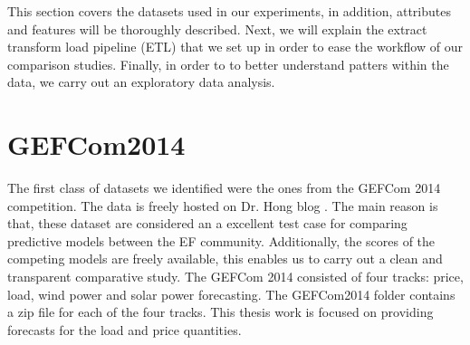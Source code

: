 






This section covers the datasets used in our experiments, in addition, attributes and features will be thoroughly described.
Next, we will explain the extract transform load pipeline (ETL) that we set up in order to ease the workflow of our comparison studies.
Finally, in order to to better understand patters within the data, we carry out an exploratory data analysis.

\section{GEFCom2014}
The first class of datasets we identified were the ones from the GEFCom 2014 competition. The data is freely hosted on Dr. Hong blog \cite{hong2016probabilistic}.
The main reason is that, these dataset are considered an a excellent test case for comparing predictive models between the EF community. Additionally, the scores of the competing models are freely available, this enables us to carry out a clean and transparent comparative study.
The GEFCom 2014 consisted of four tracks: price, load, wind power and solar power forecasting. 
The GEFCom2014 folder contains a zip file for each of the four tracks.
This thesis work is focused on providing forecasts for the load and price quantities.
\\
